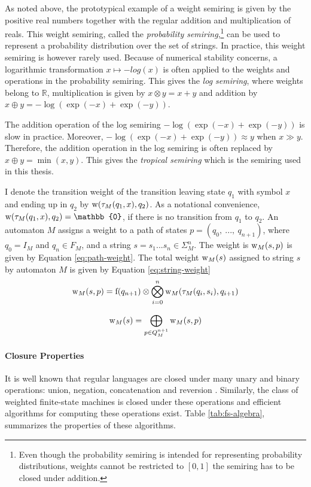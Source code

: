 As noted above, the prototypical example of a weight semiring is given by the positive real numbers together with the regular addition and multiplication of reals. This weight semiring, called the {\it probability semiring},\footnote{Even though the probability semiring is intended for representing probability distributions, weights cannot be restricted to $[0,1]$ the semiring has to be closed under addition.}  can be used to represent a probability distribution over the set of strings. In practice, this weight semiring is however rarely used. Because of numerical stability concerns, a logarithmic transformation $x \mapsto -log(x)$ is often applied to the weights and operations in the probability semiring. This gives the {\it log semiring}, where weights belong to $\mathbb{R}$, multiplication is given by $x \otimes y = x + y$ and addition by $x \oplus y = -\log(\exp(-x) + \exp(-y))$.

The addition operation of the log semiring $-\log(\exp(-x) + \exp(-y))$
is slow in practice. Moreover, $-\log(\exp(-x) + \exp(-y)) \approx y$
when $x \gg y$. Therefore, the addition operation in the log semiring
is often replaced by $x \oplus y = \min(x,y)$. This gives the {\it
  tropical semiring} which is the semiring used in this thesis.

I denote the transition weight of the transition leaving state $q_1$
with symbol $x$ and ending up in $q_2$ by $\mbox{${\rm w}$}(\tau_M(q_1,x), q_2)$. As
a notational convenience, $\w(\tau_M(q_1,x), q_2) = \mathbb{0}$, if
there is no transition from $q_1$ to $q_2$. An automaton $M$ assigns a
weight to a path of states $p = (q_0,\ ...,\ q_{n+1})$, where $q_0 =
I_M$ and $q_n \in F_M$, and a string $s = s_1...s_n \in
\Sigma_M^{n}$. The weight is $\mbox{${\rm w}$}_M(s,p)$ is given by Equation
\ref{eq:path-weight}. The total weight $\mbox{${\rm w}$}_M(s)$ assigned to string
$s$ by automaton $M$ is given by Equation \ref{eq:string-weight}
\begin{equation}
\mbox{${\rm w}$}_M(s,p) =
{\rm f}(q_{n+1})\otimes \bigotimes_{i = 0}^n \mbox{${\rm w}$}_M(\tau_M(q_i,s_i), q_{i+1})\label{eq:path-weight}
\end{equation}

\begin{equation}
\mbox{${\rm w}$}_M(s) =
\bigoplus_{p \in Q_M^{n+1}} \mbox{${\rm w}$}_M(s,p) \label{eq:string-weight}
\end{equation}

\paragraph{Closure Properties} It is well known that regular languages
are closed under many unary and binary operations: union, negation,
concatenation and reversion \citep{Sipser1996}. Similarly, the class
of weighted finite-state machines is closed under these operations and
efficient algorithms for computing these operations exist. Table
\ref{tab:fs-algebra}, summarizes the properties of these algorithms.

